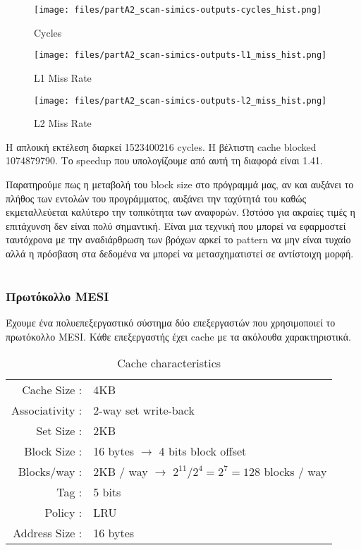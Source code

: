 \documentclass[a4paper,12pt]{article}
\begin{document}
\begin{figure}[H]
	\centering
    \texttt{[image: files/partA2\_scan-simics-outputs-cycles\_hist.png]}
	\caption{Cycles}
	\label{fig:B1}
\end{figure}

\begin{figure}[H]
	\centering
    \texttt{[image: files/partA2\_scan-simics-outputs-l1\_miss\_hist.png]}
    \caption{L1 Miss Rate}
	\label{fig:B2}
\end{figure}

\begin{figure}[H]
	\centering
    \texttt{[image: files/partA2\_scan-simics-outputs-l2\_miss\_hist.png]}
    \caption{L2 Miss Rate}
	\label{fig:B3}
\end{figure}


Η απλοική εκτέλεση διαρκεί 1523400216 cycles. H βέλτιστη cache blocked
1074879790. Το speedup που υπολογίζουμε από αυτή τη διαφορά είναι 1.41.


Παρατηρούμε πως η μεταβολή του block size στο πρόγραμμά μας, αν και αυξάνει το πλήθος των
εντολών του προγράμματος, αυξάνει την ταχύτητά του καθώς εκμεταλλεύεται
καλύτερο την τοπικότητα των αναφορών. Ωστόσο για ακραίες τιμές η επιτάχυνση
δεν είναι πολύ σημαντική. Είναι μια τεχνική που μπορεί να εφαρμοστεί
ταυτόχρονα με την αναδιάρθρωση των βρόχων αρκεί το pattern να μην είναι τυχαίο
αλλά η πρόσβαση στα δεδομένα να μπορεί να μετασχηματιστεί σε αντίστοιχη μορφή.


\setcounter{section}{0}
\part{}
\section{Πρωτόκολλο MESI}

Έχουμε ένα πολυεπεξεργαστικό σύστημα δύο επεξεργαστών που χρησιμοποιεί το
πρωτόκολλο MESI. Κάθε επεξεργαστής έχει cache με τα ακόλουθα χαρακτηριστικά.

\begin{table}[H]
    \centering
    \begin{tabular}{r l}
        Cache Size :& 4KB \\
        Associativity :& 2-way set write-back \\
        Set Size :& 2KB \\
        Block Size :& 16 bytes $\rightarrow$ 4 bits block offset\\
        Blocks/way :& 2KB / way $\rightarrow$ $2^{11}/2^4=2^7=128$ blocks / way \\
        Tag :& 5 bits \\
        Policy :& LRU \\
        Address Size :& 16 bytes \\
    \end{tabular}
    \caption{Cache characteristics}
    \label{fig:T5}
\end{table}
\end{document}
